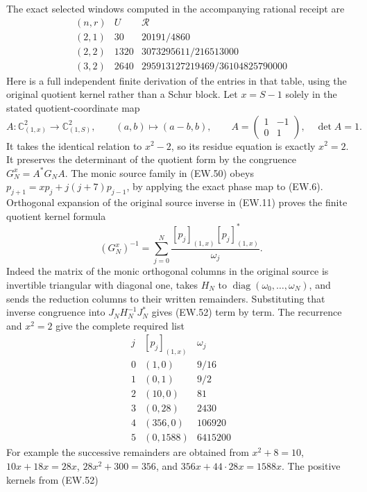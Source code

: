 \documentclass[11pt]{article}
\newcommand{\C}{\mathbb C}
\newcommand{\diag}{\operatorname{diag}}
\begin{document}
The exact selected windows computed in the accompanying rational
receipt are
\[
\begin{array}{c|c|c}
 (n,r)&U&\mathscr R\\\hline
 (2,1)&30&20191/4860\\
 (2,2)&1320&3073295611/216513000\\
 (3,2)&2640&295913127219469/36104825790000
\end{array}                                                   \tag{EW.51}
\]
Here is a full independent finite derivation of the entries in that
table, using the original quotient kernel rather than a Schur block.
Let $x=S-1$ solely in the stated quotient-coordinate map
\[
 A:\C^2_{(1,x)}\longrightarrow\C^2_{(1,S)},\qquad
 (a,b)\longmapsto(a-b,b),\qquad
 A=\begin{pmatrix}1&-1\\0&1\end{pmatrix},\quad\det A=1.
\]
It takes the identical relation to $x^2-2$, so its residue equation
is exactly $x^2=2$. It preserves the determinant of the quotient
form by the congruence $G_N^x=A^*G_NA$. The monic source family
in (EW.50) obeys
$p_{j+1}=xp_j+j(j+7)p_{j-1}$, by applying the exact phase map to
(EW.6). Orthogonal expansion of the original source inverse in
(EW.11) proves the finite quotient kernel formula
\[
 (G_N^x)^{-1}=\sum_{j=0}^N
     \frac{[p_j]_{(1,x)}[p_j]_{(1,x)}^*}{\omega_j}.
                                                               \tag{EW.52}
\]
Indeed the matrix of the monic orthogonal columns in the original
source is invertible triangular with diagonal one, takes $H_N$
to $\diag(\omega_0,\ldots,\omega_N)$, and sends the reduction
columns to their written remainders. Substituting that inverse
congruence into $J_NH_N^{-1}J_N^*$ gives (EW.52) term by term.
The recurrence and $x^2=2$ give the complete required list
\[
\begin{array}{c|c|c}
 j &[p_j]_{(1,x)}&\omega_j\\\hline
 0&(1,0)&9/16\\
 1&(0,1)&9/2\\
 2&(10,0)&81\\
 3&(0,28)&2430\\
 4&(356,0)&106920\\
 5&(0,1588)&6415200
\end{array}                                                   \tag{EW.53}
\]
For example the successive remainders are obtained from
$x^2+8=10$, $10x+18x=28x$, $28x^2+300=356$, and
$356x+44\cdot28x=1588x$. The positive kernels from (EW.52)
\end{document}
